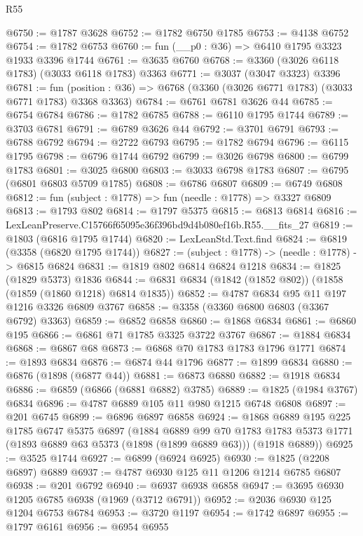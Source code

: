 \begin{lexlean}{R55}
\begin{coremodule}
@6750 := @1787 @3628
@6752 := @1782 @6750 @1785
@6753 := @4138 @6752
@6754 := @1782 @6753
@6760 := fun (__p0 : @36) => @6410 @1795 @3323 @1933 @3396 @1744
@6761 := @3635 @6760
@6768 := @3360 (@3026 @6118 @1783) (@3033 @6118 @1783) @3363
@6771 := @3037 (@3047 @3323) @3396
@6781 := fun (position : @36) => @6768 (@3360 (@3026 @6771 @1783) (@3033 @6771 @1783) @3368 @3363)
@6784 := @6761 @6781 @3626 @44
@6785 := @6754 @6784
@6786 := @1782 @6785
@6788 := @6110 @1795 @1744
@6789 := @3703 @6781
@6791 := @6789 @3626 @44
@6792 := @3701 @6791
@6793 := @6788 @6792
@6794 := @2722 @6793
@6795 := @1782 @6794
@6796 := @6115 @1795
@6798 := @6796 @1744 @6792
@6799 := @3026 @6798
@6800 := @6799 @1783
@6801 := @3025 @6800
@6803 := @3033 @6798 @1783
@6807 := @6795 (@6801 @6803 @5709 @1785)
@6808 := @6786 @6807
@6809 := @6749 @6808
@6812 := fun (subject : @1778) => fun (needle : @1778) => @3327 @6809
@6813 := @1793 @802
@6814 := @1797 @5375
@6815 := @6813 @6814
@6816 := LexLeanPreserve.C15766f65095e36f396bd9d4b080ef16b.R55.__fits_27
@6819 := @1803 (@6816 @1795 @1744)
@6820 := LexLeanStd.Text.find
@6824 := @6819 (@3358 (@6820 @1795 @1744))
@6827 := (subject : @1778) -> (needle : @1778) -> @6815 @6824
@6831 := @1819 @802 @6814 @6824 @1218
@6834 := @1825 (@1829 @5373) @1836
@6844 := @6831 @6834 (@1842 (@1852 @802)) (@1858 (@1859 (@1860 @1218) @6814 @1835))
@6852 := @4787 @6834 @95 @11 @197 @1216 @3326 @6809 @3767
@6858 := @3358 (@3360 @6800 @6803 (@3367 @6792) @3363)
@6859 := @6852 @6858
@6860 := @1868 @6834
@6861 := @6860 @195
@6866 := @6861 @71 @1785 @3325 @3722 @3767
@6867 := @1884 @6834
@6868 := @6867 @68
@6873 := @6868 @70 @1783 @1783 @1796 @1771
@6874 := @1893 @6834
@6876 := @6874 @44 @1796
@6877 := @1899 @6834
@6880 := @6876 (@1898 (@6877 @44))
@6881 := @6873 @6880
@6882 := @1918 @6834
@6886 := @6859 (@6866 (@6881 @6882) @3785)
@6889 := @1825 (@1984 @3767) @6834
@6896 := @4787 @6889 @105 @11 @980 @1215 @6748 @6808
@6897 := @201 @6745
@6899 := @6896 @6897 @6858
@6924 := @1868
    @6889
    @195
    @225
    @1785
    @6747
    @5375
    @6897
    (@1884
      @6889
      @99
      @70
      @1783
      @1783
      @5373
      @1771
      (@1893 @6889 @63 @5373 (@1898 (@1899 @6889 @63)))
      (@1918 @6889))
@6925 := @3525 @1744
@6927 := @6899 (@6924 @6925)
@6930 := @1825 (@2208 @6897) @6889
@6937 := @4787 @6930 @125 @11 @1206 @1214 @6785 @6807
@6938 := @201 @6792
@6940 := @6937 @6938 @6858
@6947 := @3695 @6930 @1205 @6785 @6938 (@1969 (@3712 @6791))
@6952 := @2036 @6930 @125 @1204 @6753 @6784
@6953 := @3720 @1197
@6954 := @1742 @6897
@6955 := @1797 @6161
@6956 := @6954 @6955

\end{coremodule}
\end{lexlean}

